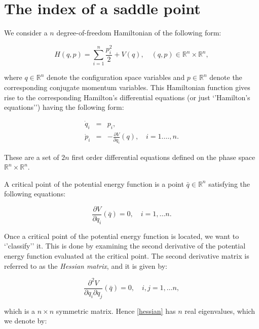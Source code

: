 \documentclass{article}
\begin{document}
\section*{The index of a saddle point}


We consider a  $n$ degree-of-freedom Hamiltonian of the following form:

\begin{equation}
H(q, p) = \sum_{i=1}^{n} \frac{p_i^2}{2} + V(q), \quad (q,p) \in \mathbb{R}^n \times \mathbb{R}^n,
\label{ham_int}
\end{equation}

\noindent
where $q \in \mathbb{R}^n$ denote the configuration space variables and $p \in \mathbb{R}^n$ denote the corresponding conjugate momentum variables.  This Hamiltonian function gives rise to the corresponding Hamilton's differential equations (or just `'Hamilton's equations'') having the following form:

\begin{eqnarray}
\dot{q}_i & = & p_i, \nonumber \\
\dot{p}_i & = & -\frac{\partial V}{\partial q_i} (q), \quad i=1. \ldots , n.
\label{hameq_int}
\end{eqnarray}

\noindent
These are a set of $2n$ first order differential equations defined on the phase space 
$\mathbb{R}^n \times \mathbb{R}^n$. 



 
A critical point of the potential energy function is a point $\bar{q} \in \mathbb{R}^n$ satisfying the following equations:


\begin{equation}
\frac{\partial V}{\partial q_i} (\bar{q}) =0, \quad i=1, \ldots n.
\end{equation}

\noindent
Once a critical point of the potential energy function is located, we want to `'classify'' it. This is done by examining the second derivative of the potential energy function evaluated at the critical point. The second derivative matrix  is referred to as the {\em Hessian matrix}, and it is given by:

\begin{equation}
\frac{\partial^2 V}{\partial q_i \partial q_j} (\bar{q}) =0, \quad i,j=1, \ldots n,
\label{hessian}
\end{equation}

\noindent
which is a $n \times n$ symmetric matrix. Hence \eqref{hessian} has $n$ real eigenvalues, which we denote by:
\end{document}
